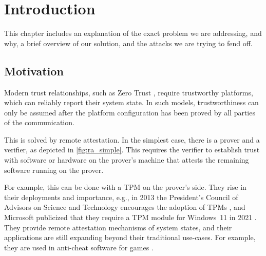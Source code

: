
\chapter{Introduction}\label{chapter:introduction}

This chapter includes an explanation of the exact problem we are addressing, and why, a brief overview of our solution, and the attacks we are trying to fend off.


\section{Motivation}


Modern trust relationships, such as Zero Trust \cite{isaca2021}, require trustworthy platforms, which can reliably report their system state.
In such models, trustworthiness can only be assumed after the platform configuration has been proved by all parties of the communication.


This is solved by remote attestation. In the simplest case, there is a prover and a verifier, as depicted in \autoref{fig:ra_simple}. This requires the verifier to establish trust with software or hardware on the prover's machine that attests the remaining software running on the prover.




For example, this can be done with a \ac{TPM} on the prover's side. They rise in their deployments and importance, e.g., in 2013 the President's Council of Advisors on Science and Technology encourages the adoption of TPMs \cite{usa}, and Microsoft publicized that they require a TPM module for Windows~11 in 2021 \cite{win11req}.
They provide remote attestation mechanisms of system states, and their applications are still expanding beyond their traditional use-cases. For example, they are used in anti-cheat software for games \cite{valorant}.


